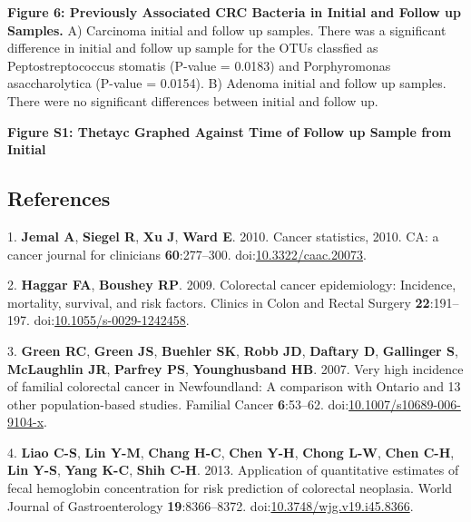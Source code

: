 \documentclass[12pt,]{article}
\begin{document}
\textbf{Figure 6: Previously Associated CRC Bacteria in Initial and
Follow up Samples.} A) Carcinoma initial and follow up samples. There
was a significant difference in initial and follow up sample for the
OTUs classfied as Peptostreptococcus stomatis (P-value = 0.0183) and
Porphyromonas asaccharolytica (P-value = 0.0154). B) Adenoma initial and
follow up samples. There were no significant differences between initial
and follow up.

\newpage

\textbf{Figure S1: Thetayc Graphed Against Time of Follow up Sample from
Initial}

\newpage

\subsection*{References}\label{references}

\hypertarget{refs}{}
\hypertarget{ref-jemal_cancer_2010}{}
1. \textbf{Jemal A}, \textbf{Siegel R}, \textbf{Xu J}, \textbf{Ward E}.
2010. Cancer statistics, 2010. CA: a cancer journal for clinicians
\textbf{60}:277--300.
doi:\href{https://doi.org/10.3322/caac.20073}{10.3322/caac.20073}.

\hypertarget{ref-haggar_colorectal_2009}{}
2. \textbf{Haggar FA}, \textbf{Boushey RP}. 2009. Colorectal cancer
epidemiology: Incidence, mortality, survival, and risk factors. Clinics
in Colon and Rectal Surgery \textbf{22}:191--197.
doi:\href{https://doi.org/10.1055/s-0029-1242458}{10.1055/s-0029-1242458}.

\hypertarget{ref-green_very_2007}{}
3. \textbf{Green RC}, \textbf{Green JS}, \textbf{Buehler SK},
\textbf{Robb JD}, \textbf{Daftary D}, \textbf{Gallinger S},
\textbf{McLaughlin JR}, \textbf{Parfrey PS}, \textbf{Younghusband HB}.
2007. Very high incidence of familial colorectal cancer in Newfoundland:
A comparison with Ontario and 13 other population-based studies.
Familial Cancer \textbf{6}:53--62.
doi:\href{https://doi.org/10.1007/s10689-006-9104-x}{10.1007/s10689-006-9104-x}.

\hypertarget{ref-liao_application_2013}{}
4. \textbf{Liao C-S}, \textbf{Lin Y-M}, \textbf{Chang H-C}, \textbf{Chen
Y-H}, \textbf{Chong L-W}, \textbf{Chen C-H}, \textbf{Lin Y-S},
\textbf{Yang K-C}, \textbf{Shih C-H}. 2013. Application of quantitative
estimates of fecal hemoglobin concentration for risk prediction of
colorectal neoplasia. World Journal of Gastroenterology
\textbf{19}:8366--8372.
doi:\href{https://doi.org/10.3748/wjg.v19.i45.8366}{10.3748/wjg.v19.i45.8366}.
\end{document}
